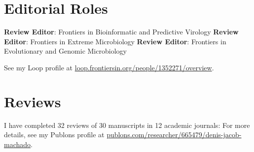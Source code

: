 
\section{Editorial Roles}

	    {\textbf{Review Editor}: Frontiers in Bioinformatic and Predictive Virology}
	\cvline{---}
	    {\textbf{Review Editor}: Frontiers in Extreme Microbiology}
	\cvline{---}
	    {\textbf{Review Editor}: Frontiers in Evolutionary and Genomic Microbiology}

\vspace{0.5em}

See my Loop profile at  \href{https://loop.frontiersin.org/people/1352271/overview}{loop.frontiersin.org/people/1352271/overview}.

\section{Reviews}
    
    I have completed 32 reviews of 30 manuscripts in 12 academic journals:
    {\footnotesize
    }
    For more details, see my Publons profile at  \href{https://publons.com/researcher/665479/denis-jacob-machado/}{publons.com/researcher/665479/denis-jacob-machado}.

